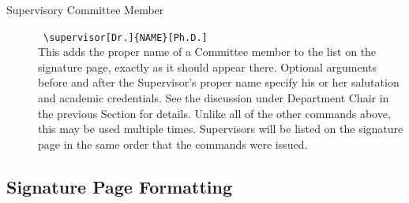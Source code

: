 \documentclass[11pt]{article}
\begin{document}
\begin{description}
\item[Supervisory Committee Member] \dotfill\ \verb=\supervisor[Dr.]{NAME}[Ph.D.]=\\
This adds the proper name of a Committee member to the list on the signature page, exactly as it should appear there.  Optional arguments before and after the Supervisor's proper name specify his or her salutation and academic credentials.  See the discussion under Department Chair in the previous Section for details.  Unlike all of the other commands above, this may be used multiple times.  Supervisors will be listed on the signature page in the same order that the commands were issued.

\end{description}


\subsection{Signature Page Formatting}\label{signature}
\end{document}
